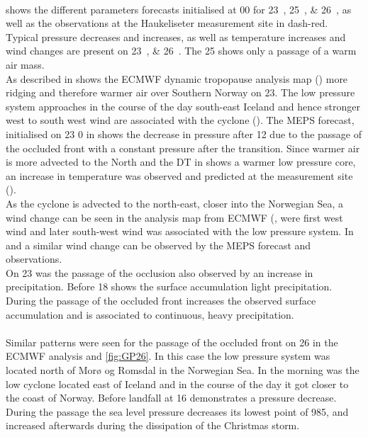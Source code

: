 \\
 shows the different parameters forecasts initialised at \SI{00}{\UTC} for \SIlist{23;25;26}{\dec}, as well as the observations at the Haukeliseter measurement site in dash-red.
Typical pressure decreases and increases, as well as temperature increases and wind changes are present on \SIlist{23;26}{\dec}. The \SI{25}{\dec} shows only a passage of a warm air mass. 
\\
As described in  shows the ECMWF dynamic tropopause analysis map () more ridging and therefore warmer air over Southern Norway on \SI{23}{\dec}. The low pressure system approaches in the course of the day south-east Iceland and hence stronger west to south west wind are associated with the cyclone (). The MEPS forecast, initialised on \SI{23}{\dec} \SI{0}{\UTC} in  shows the decrease in pressure after \SI{12}{\UTC} due to the passage of the occluded front with a constant pressure after the transition. Since warmer air is more advected to the North and the DT in  shows a warmer low pressure core, an increase in temperature was observed and predicted at the measurement site (). 
\\
As the cyclone is advected to the north-east, closer into the Norwegian Sea, a wind change can be seen in the analysis map from ECMWF (, were first west wind and later south-west wind was associated with the low pressure system. In  and  a similar wind change can be observed by the MEPS forecast and observations.
\\
On \SI{23}{\dec} was the passage of the occlusion also observed by an increase in precipitation. Before \SI{18}{\UTC} shows the surface accumulation light precipitation. During the passage of the occluded front increases the observed surface accumulation and is associated to continuous, heavy precipitation.
\\
\\
Similar patterns were seen for the passage of the occluded front on \SI{26}{\dec} in the ECMWF analysis  and \ref{fig:GP26}. In this case the low pressure system was located north of Morø og Romsdal in the Norwegian Sea. In the morning was the low cyclone located east of Iceland and in the course of the day it got closer to the coast of Norway. Before landfall at \SI{16}{\UTC} demonstrates  a pressure decrease. During the passage the sea level pressure decreases its lowest point of \SI{985}{\hPa}, and increased afterwards during the dissipation of the Christmas storm.
